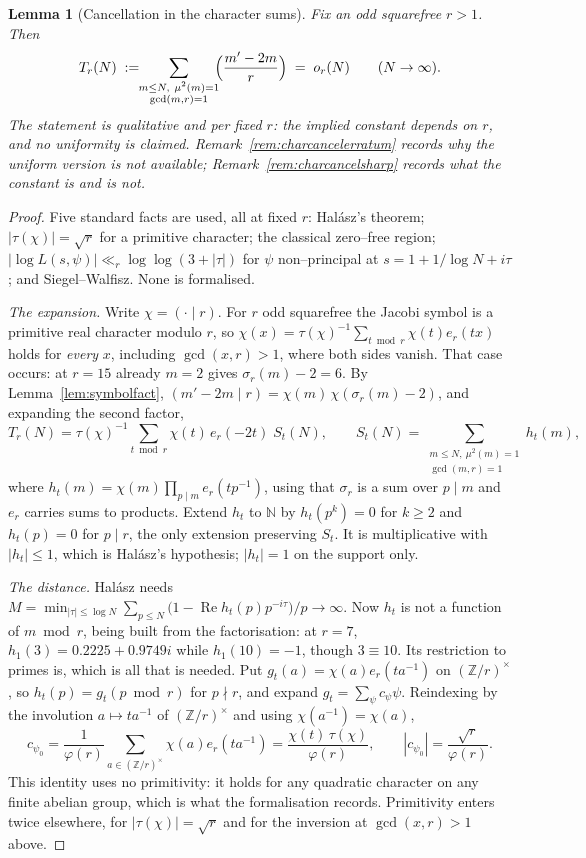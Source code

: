 \documentclass[11pt]{article}
\newtheorem{lemma}[theorem]{Lemma}
\theoremstyle{definition}
\begin{document}
\begin{lemma}[Cancellation in the character sums]\label{lem:charcancel}
Fix an odd squarefree $r>1$. Then
\[ T_r(N)\;:=\!\!\sum_{\substack{m\le N,\ \mu^2(m)=1\\ \gcd(m,r)=1}}\!\!\Bigl(\frac{m'-2m}{r}\Bigr)\;=\;o_r(N)
\qquad (N\to\infty). \]
The statement is qualitative and per fixed $r$: the implied constant depends on $r$, and no
uniformity is claimed. Remark~\ref{rem:charcancelerratum} records why the uniform version is not available; Remark~\ref{rem:charcancelsharp}
records what the constant is and is not.
\end{lemma}
\begin{proof}
Five standard facts are used, all at fixed $r$: Hal\'asz's theorem; $|\tau(\chi)|=\sqrt r$ for a
primitive character; the classical zero--free region; $|\log L(s,\psi)|\ll_r\log\log(3+|\tau|)$ for
$\psi$ non--principal at $s=1+1/\log N+i\tau$; and Siegel--Walfisz. None is formalised.

\emph{The expansion.} Write $\chi=(\cdot\mid r)$. For $r$ odd squarefree the Jacobi symbol is a
primitive real character modulo $r$, so
$\chi(x)=\tau(\chi)^{-1}\sum_{t\bmod r}\chi(t)e_r(tx)$ holds for \emph{every} $x$, including
$\gcd(x,r)>1$, where both sides vanish. That case occurs: at $r=15$ already $m=2$ gives
$\sigma_r(m)-2=6$. By Lemma~\ref{lem:symbolfact},
$(m'-2m\mid r)=\chi(m)\,\chi(\sigma_r(m)-2)$, and expanding the second factor,
\[ T_r(N)=\tau(\chi)^{-1}\sum_{t\bmod r}\chi(t)\,e_r(-2t)\;S_t(N),\qquad
   S_t(N)=\!\!\sum_{\substack{m\le N,\ \mu^2(m)=1\\ \gcd(m,r)=1}}\!\!h_t(m), \]
where $h_t(m)=\chi(m)\prod_{p\mid m}e_r(tp^{-1})$, using that $\sigma_r$ is a sum over $p\mid m$ and
$e_r$ carries sums to products. Extend $h_t$ to $\mathbb{N}$ by $h_t(p^k)=0$ for $k\ge2$ and
$h_t(p)=0$ for $p\mid r$, the only extension preserving $S_t$. It is multiplicative with
$|h_t|\le1$, which is Hal\'asz's hypothesis; $|h_t|=1$ on the support only.

\emph{The distance.} Hal\'asz needs
$M=\min_{|\tau|\le\log N}\sum_{p\le N}\bigl(1-\operatorname{Re}h_t(p)p^{-i\tau}\bigr)/p\to\infty$.
Now $h_t$ is not a function of $m\bmod r$, being built from the factorisation: at $r=7$,
$h_1(3)=0.2225+0.9749i$ while $h_1(10)=-1$, though $3\equiv10$. Its restriction to primes is,
which is all that is needed. Put $g_t(a)=\chi(a)e_r(ta^{-1})$ on $(\mathbb{Z}/r)^\times$, so
$h_t(p)=g_t(p\bmod r)$ for $p\nmid r$, and expand $g_t=\sum_\psi c_\psi\psi$. Reindexing by the
involution $a\mapsto ta^{-1}$ of $(\mathbb{Z}/r)^\times$ and using $\chi(a^{-1})=\chi(a)$,
\[ c_{\psi_0}=\frac1{\varphi(r)}\sum_{a\in(\mathbb{Z}/r)^\times}\chi(a)e_r(ta^{-1})
   =\frac{\chi(t)\,\tau(\chi)}{\varphi(r)},\qquad |c_{\psi_0}|=\frac{\sqrt r}{\varphi(r)}. \]
This identity uses no primitivity: it holds for any quadratic character on any finite abelian group,
which is what the formalisation records. Primitivity enters twice elsewhere, for
$|\tau(\chi)|=\sqrt r$ and for the inversion at $\gcd(x,r)>1$ above.


\end{proof}
\end{document}

